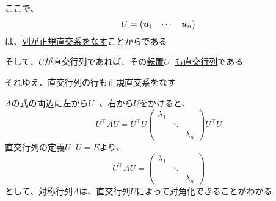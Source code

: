 \documentclass[../../../topic_linear-algebra]{subfiles}
\begin{document}
ここで、
\begin{equation*}
  U = \begin{pmatrix}
    \vb*{u}_1 & \cdots & \vb*{u}_n
  \end{pmatrix}
\end{equation*}
は、\hyperref[thm:unitary-iff-columns-orthonormal]{列が正規直交系をなす}ことからである

\br

そして、$U$が直交行列であれば、その\hyperref[thm:transpose-of-orthogonal]{転置$U^\top$も直交行列}である

それゆえ、直交行列の行も正規直交系をなす

\br

$A$の式の両辺に左から$U^\top$、右から$U$をかけると、
\begin{equation*}
  U^\top A U  = U^\top U \begin{pmatrix}
    \lambda_1 &        &           \\
              & \ddots &           \\
              &        & \lambda_n
  \end{pmatrix} U^\top U
\end{equation*}
直交行列の定義$U^\top U = E$より、
\begin{equation*}
  U^\top A U =\begin{pmatrix}
    \lambda_1 &        &           \\
              & \ddots &           \\
              &        & \lambda_n
  \end{pmatrix}
\end{equation*}
として、対称行列$A$は、直交行列$U$によって対角化できることがわかる
\end{document}
